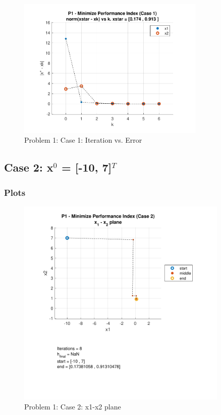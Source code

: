 \documentclass[conf]{new-aiaa}
\begin{document}
\begin{figure}[H]
	\begin{center}
		\includegraphics[width=0.8\textwidth]{P1 - Minimize Performance Index (Case 1) - norm(xstar - xk) vs k. xstar = [0.174 , 0.913 ].pdf}
	\end{center}
	\caption{Problem 1: Case 1: Iteration vs. Error}
\end{figure}

\subsection{Case 2: x$^0$ = [-10, 7]$^T$}

\subsubsection{Plots}

\begin{figure}[H]
	\begin{center}
		\includegraphics[width=0.9\textwidth]{P1 - Minimize Performance Index (Case 2) - x_1 - x_2 plane.pdf}
	\end{center}
	\caption{Problem 1: Case 2: x1-x2 plane}
\end{figure}
\end{document}
